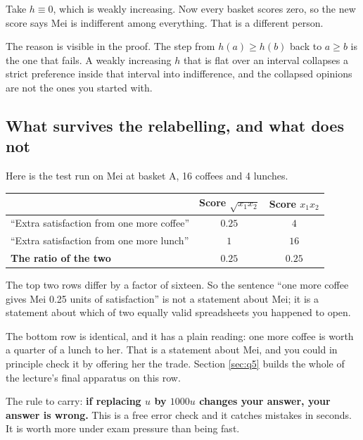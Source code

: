 \documentclass[11pt,letterpaper]{article}
\theoremstyle{definition}
\theoremstyle{plain}
\begin{document}
Take $h \equiv 0$, which is weakly increasing. Now every basket scores zero, so the new score says
Mei is indifferent among everything. That is a different person.

The reason is visible in the proof. The step from $h(a) \ge h(b)$ back to $a \ge b$ is the one that
fails. A weakly increasing $h$ that is flat over an interval collapses a strict preference inside
that interval into indifference, and the collapsed opinions are not the ones you started with.

\subsection{What survives the relabelling, and what does not}

Here is the test run on Mei at basket A, 16 coffees and 4 lunches.

\begin{center}
\begin{tabular}{@{}lcc@{}}
\toprule
& \textbf{Score} $\sqrt{x_1 x_2}$ & \textbf{Score} $x_1 x_2$ \\
\midrule
``Extra satisfaction from one more coffee'' & $0.25$ & $4$ \\
``Extra satisfaction from one more lunch'' & $1$ & $16$ \\
\midrule
\textbf{The ratio of the two} & $\mathbf{0.25}$ & $\mathbf{0.25}$ \\
\bottomrule
\end{tabular}
\end{center}

The top two rows differ by a factor of sixteen. So the sentence ``one more coffee gives Mei 0.25
units of satisfaction'' is not a statement about Mei; it is a statement about which of two equally
valid spreadsheets you happened to open.

The bottom row is identical, and it has a plain reading: one more coffee is worth a quarter of a
lunch to her. That is a statement about Mei, and you could in principle check it by offering her the
trade. Section \ref{sec:q5} builds the whole of the lecture's final apparatus on this row.

\begin{snugshade}
\noindent The rule to carry: \textbf{if replacing $u$ by $1000u$ changes your answer, your answer is
wrong.} This is a free error check and it catches mistakes in seconds. It is worth more under exam
pressure than being fast.
\end{snugshade}
\end{document}

